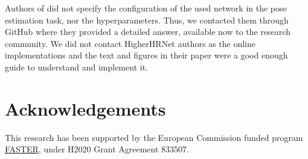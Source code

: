 Authors of \cite{chen2020end} did not specify the configuration of the used network in the pose estimation task, nor the hyperparameters. 
Thus, we contacted them through GitHub where they provided a detailed answer, available now to the research community.
We did not contact HigherHRNet authors \cite{cheng2020higherhrnet} as the online implementations and the text and figures in their paper were a good enough guide to understand and implement it.

\section*{Acknowledgements}
This research has been supported by the European Commission funded program \href{https://www.faster-project.eu/}{FASTER}, under H2020 Grant Agreement 833507.

%  
%
%